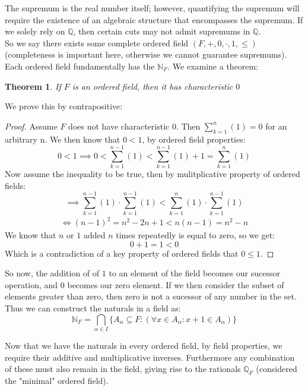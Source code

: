\documentclass{article}
\newtheorem{thm}{Theorem}[section]
\begin{document}
The supremum is the real number itself; however, quantifying the supremum will require the existence of an algebraic structure that encompasses the supremum. If we solely rely on $\mathbb{Q}$, then certain cuts may not admit supremums in $\mathbb{Q}$.\\

So we say there exists some complete ordered field $(F, +, 0, \cdot, 1, \leqslant)$ (completeness is important here, otherwise we cannot guarantee supremums). Each ordered field fundamentally has the $\mathbb{N}_F$. We examine a theorem:
\begin{thm}
    If $F$ is an ordered field, then it has characteristic $0$
\end{thm}
\noindent We prove this by contrapositive:
\begin{proof}
Assume $F$ does not have characteristic 0. Then $\sum_{k=1}^{n}(1) = 0$ for an arbitrary n. We then know that $0 < 1$, by ordered field properties:
\begin{equation*}
    0 < 1 \implies 0 < \sum_{k=1}^{n-1}(1) < \sum_{k=1}^{n-1}(1) + 1 = \sum_{k=1}^{n}(1)
\end{equation*}
Now assume the inequality to be true, then by mulitplicative property of ordered fields:
\begin{equation*}
    \implies \sum_{k=1}^{n-1}(1) \cdot \sum_{k=1}^{n-1}(1) < \sum_{k=1}^{n}(1) \cdot \sum_{k=1}^{n-1}(1)
\end{equation*}
\begin{eqnarray}
    \iff (n-1)^2 = n^2 - 2n + 1 < n(n-1) = n^2 - n
\end{eqnarray}
We know that $n$ or $1$ added $n$ times repeatedly is equal to zero, so we get:
\begin{equation*}
    0 + 1 = 1 < 0
\end{equation*}
Which is a contradiction of a key property of ordered fields that $0 \leqslant 1$. 
\end{proof}
\noindent So now, the addition of of $1$ to an element of the field becomes our sucessor operation, and $0$ becomes our zero element. If we then consider the subset of elements greater than zero, then zero is not a sucessor of any number in the set. Thus we can construct the naturals in a field as:
\begin{equation*}
    \mathbb{N}_F = \bigcap_{\alpha \in I}\{A_\alpha \subseteq F: (\forall x \in A_\alpha: x +1 \in A_\alpha)\}
\end{equation*}

\noindent Now that we have the naturals in every ordered field, by field properties, we require their additive and multiplicative inverses. Furthermore any combination of these must also remain in the field, giving rise to the rationals $\mathbb{Q}_F$ (considered the "minimal" ordered field).\\
\end{document}
